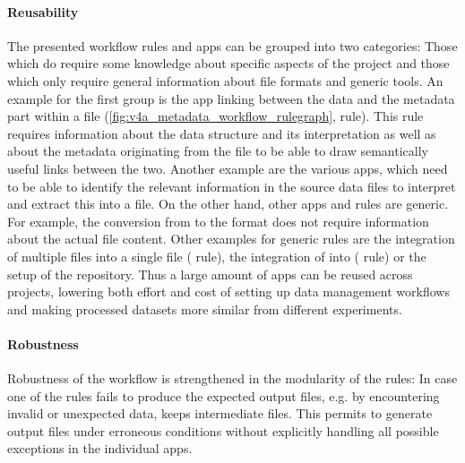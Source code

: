 \paragraph{Reusability}
The presented workflow rules and apps can be grouped into two categories: Those which do require some knowledge about specific aspects of the project and those which only require general information about file formats and generic tools. An  example for the first group is the app linking between the data and the metadata part within a  file (\cref{fig:v4a_metadata_workflow_rulegraph},  rule). This rule requires information about the data structure and its interpretation as well as about the metadata originating from the  file to be able to draw semantically useful links between the two. Another example are the various  apps, which need to be able to identify the relevant information in the source data files to interpret and extract this into a  file.
On the other hand, other apps and rules are generic. For example, the conversion from  to the  format does not require information about the actual file content. Other examples for generic rules are the integration of multiple  files into a single file ( rule), the integration of  into  ( rule) or the setup of the  repository. Thus a large amount of apps can be reused across projects, lowering both effort and cost of setting up data management workflows  and making processed datasets more similar from different experiments.

\paragraph{Robustness}
Robustness of the workflow is strengthened in the modularity of the  rules: In case one of the rules fails to produce the expected output files, e.g. by encountering invalid or unexpected data,  keeps intermediate files. This permits to generate output files under erroneous conditions without explicitly handling all possible exceptions in the individual apps.

